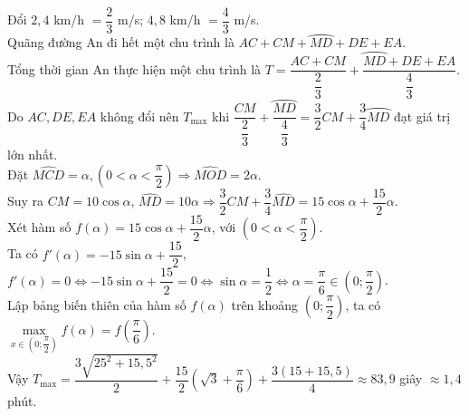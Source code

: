 \begin{bt}
{\begin{center}
		\end{center}
		Đổi $2{,}4$ km/h $= \dfrac{2}{3}$  m/s; $4,8$ km/h $= \dfrac{4}{3}$ m/s.\\
		Quãng đường An đi hết một chu trình là  $AC + CM + \wideparen{MD} + DE + EA$.\\
		Tổng thời gian An thực hiện một chu trình là $T = \dfrac{AC + CM}{\dfrac{2}{3}} + \dfrac{\wideparen{MD} + DE + EA}{\dfrac{4}{3}}$.\\ 
		Do $AC, DE, EA$  không đổi nên $T_{\max}$ khi $\dfrac{CM}{\dfrac{2}{3}} + \dfrac{\wideparen{MD}}{\dfrac{4}{3}} = \dfrac{3}{2}CM + \dfrac{3}{4}\wideparen{MD}$ đạt giá trị lớn nhất.\\
		Đặt $\widehat{MCD}  = \alpha, \left(0 < \alpha < \dfrac{\pi}{2}\right) \Rightarrow \widehat{MOD} = 2\alpha$.\\
		Suy ra $CM = 10\cos\alpha$, $\widehat{MD} = 10\alpha \Rightarrow \dfrac{3}{2}CM  + \dfrac{3}{4}\widehat{MD} = 15\cos\alpha + \dfrac{15}{2}\alpha$.\\
		Xét hàm số $f(\alpha) = 15\cos\alpha + \dfrac{15}{2}\alpha$, với $\left(0 < \alpha <  \dfrac{\pi}{2}\right)$.\\
		Ta có $f'(\alpha) = -15\sin\alpha + \dfrac{15}{2}$,  $f'(\alpha)=0 \Leftrightarrow -15\sin\alpha + \dfrac{15}{2} = 0 \Leftrightarrow \sin\alpha = \dfrac{1}{2} \Leftrightarrow \alpha = \dfrac{\pi}{6} \in \left(0; \dfrac{\pi}{2}\right)$.\\
		Lập bảng biến thiên của hàm số $f(\alpha)$ trên khoảng $\left(0;  \dfrac{\pi}{2}\right)$, ta có $\max\limits_{x\in \left(0; \dfrac{\pi}{2}\right) } f(\alpha) = f\left(\dfrac{\pi}{6}\right)$.\\
		Vậy $T_{\max} =  \dfrac{3\sqrt{25^2 + 15{,}5^2}}{2} + \dfrac{15}{2}\left(\sqrt{3} + \dfrac{\pi}{6}\right) + \dfrac{3(15+15{,}5)}{4} \approx 83{,}9$ giây $\approx 1{,}4$ phút.
	 }
\end{bt}

